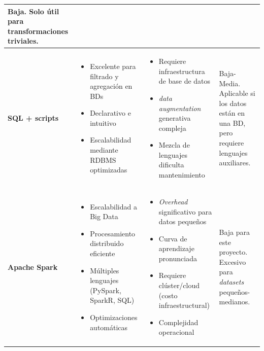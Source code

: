 \begin{xltabular}{\textwidth}{@{} >{\centering\arraybackslash}p{0.13\textwidth} >{\raggedright\arraybackslash}X >{\raggedright\arraybackslash}X >{\raggedright\arraybackslash}X @{}}
	Baja. Solo útil para transformaciones triviales. \\
	\midrule
	\textbf{SQL + scripts} &
	\begin{itemize}[nosep] \item Excelente para filtrado y agregación en BDs \item Declarativo e intuitivo \item Escalabilidad mediante RDBMS optimizadas \end{itemize} &
	\begin{itemize}[nosep] \item Requiere infraestructura de base de datos \item \textit{data augmentation} generativa compleja \item Mezcla de lenguajes dificulta mantenimiento \end{itemize} &
	Baja-Media. Aplicable si los datos están en una BD, pero requiere lenguajes auxiliares. \\
	\midrule
	\textbf{Apache Spark} &
	\begin{itemize}[nosep] \item Escalabilidad a Big Data \item Procesamiento distribuido eficiente \item Múltiples lenguajes (PySpark, SparkR, SQL) \item Optimizaciones automáticas \end{itemize} &
	\begin{itemize}[nosep] \item \textit{Overhead} significativo para datos pequeños \item Curva de aprendizaje pronunciada \item Requiere clúster/cloud (costo infraestructural) \item Complejidad operacional \end{itemize} &
	Baja para este proyecto. Excesivo para \textit{datasets} pequeños-medianos. \\
\end{xltabular}
{\captionsetup{type=table,hypcap=false}\label{tab:comparativa_herramientas_datos}}

\normalsize

